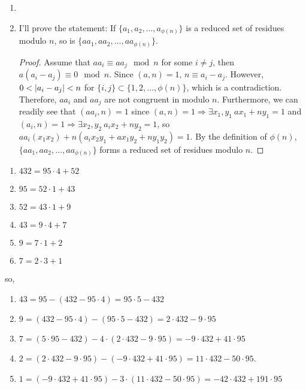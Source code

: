 \documentclass[12pt]{article}
\newenvironment{problem}[2][Problem]{\begin{trivlist}
\item[\hskip \labelsep {\bfseries #1}\hskip \labelsep {\bfseries #2.}]}{\end{trivlist}}
\begin{document}




\begin{problem}{1}
\end{problem}
\begin{enumerate}

    \item[(a)] 

    \item[(b)] I'll prove the statement: If $\{a_1, a_2, \ldots, a_{\phi(n)}\}$ is a reduced set of residues modulo $n$, so is $\{aa_1, aa_2, \ldots, aa_{\phi(n)}\}$.
    \begin{proof}
    Assume that $aa_i\equiv aa_j \mod n$ for some $i\neq j$, then $a(a_i-a_j)\equiv 0 \mod n$. Since $(a,n)=1$, $n\equiv a_i-a_j$. However, $0<\abs{a_i-a_j}<n$ for $\{i,j\}\subset \{1, 2, \ldots, \phi(n)\}$, which is a contradiction. Therefore, $aa_i$ and $aa_j$ are not congruent in modulo $n$. Furthermore, we can readily see that $(aa_i, n)=1$ since $(a,n)=1\Rightarrow \exists x_1,y_1~ax_1+ny_1=1$ and $(a_i, n)=1\Rightarrow \exists x_2, y_2~a_ix_2+ny_2=1$, so $aa_i(x_1x_2)+n(a_ix_2y_1+ax_1y_2+ny_1y_2)=1$. By the definition of $\phi(n)$, $\{aa_1, aa_2, \ldots, aa_{\phi(n)}\}$ forms a reduced set of residues modulo $n$.
    \end{proof} 
    
\end{enumerate}



\newpage
\begin{problem}{2}
\end{problem}
\begin{enumerate}
\item $432=95\cdot 4+52$
\item $95=52\cdot 1+43$
\item $52=43\cdot 1+9$
\item $43=9\cdot 4+7$
\item $9=7 \cdot 1+2$
\item $7=2\cdot 3 +1$
\end{enumerate}
so,
\begin{enumerate}
\item $43=95-(432-95\cdot 4)=95\cdot 5-432$
\item $9=(432-95\cdot 4)-(95\cdot 5-432)=2\cdot 432 - 9\cdot 95$
\item $7=(5\cdot 95-432)-4\cdot (2\cdot 432 - 9\cdot 95)=-9\cdot 432 + 41\cdot 95$
\item $2=(2\cdot 432 - 9\cdot 95)-(-9\cdot 432 + 41\cdot 95)=11\cdot 432 - 50\cdot 95$.
\item $1=(-9\cdot 432 + 41\cdot 95)-3\cdot(11\cdot 432 - 50\cdot 95)=-42\cdot 432 + 191 \cdot 95$
\end{enumerate}
\end{document}
